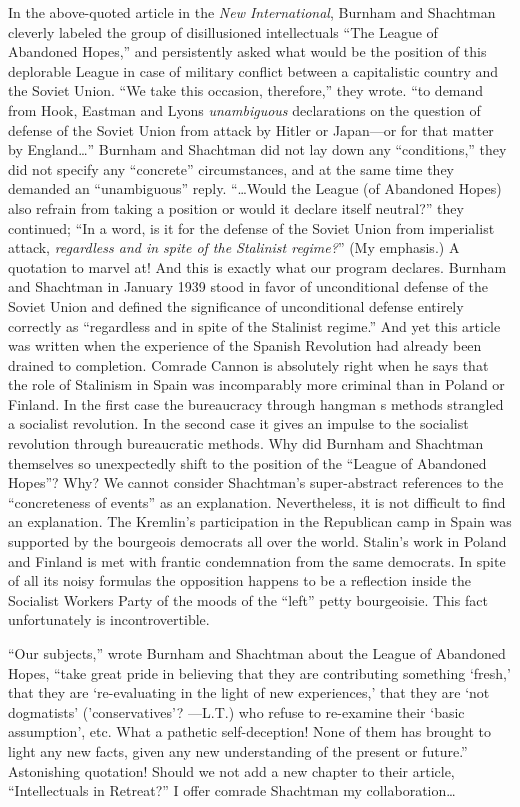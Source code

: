 In the above-quoted article in the \emph{New International}, Burnham and Shachtman cleverly labeled the group of disillusioned intellectuals “The League of Abandoned Hopes,” and persistently asked what would be the position of this deplorable League in case of military conflict between a capitalistic country and the Soviet Union. “We take this occasion, therefore,” they wrote. “to demand from Hook, Eastman and Lyons \emph{unambiguous} declarations on the question of defense of the Soviet Union from attack by Hitler or Japan---or for that matter by England\dots” Burnham and Shachtman did not lay down any “conditions,” they did not specify any “concrete” circumstances, and at the same time they demanded an “unambiguous” reply. “\dots Would the League (of Abandoned Hopes) also refrain from taking a position or would it declare itself neutral?” they continued; “In a word, is it for the defense of the Soviet Union from imperialist attack, \emph{regardless and in spite of the Stalinist regime?}” (My emphasis.) A quotation to marvel at! And this is exactly what our program declares. Burnham and Shachtman in January 1939 stood in favor of unconditional defense of the Soviet Union and defined the significance of unconditional defense entirely correctly as “regardless and in spite of the Stalinist regime.” And yet this article was written when the experience of the Spanish Revolution had already been drained to completion. Comrade Cannon is absolutely right when he says that the role of Stalinism in Spain was incomparably more criminal than in Poland or Finland. In the first case the bureaucracy through hangman s methods strangled a socialist revolution. In the second case it gives an impulse to the socialist revolution through bureaucratic methods. Why did Burnham and Shachtman themselves so unexpectedly shift to the position of the “League of Abandoned Hopes”? Why? We cannot consider Shachtman’s super-abstract references to the “concreteness of events” as an explanation. Nevertheless, it is not difficult to find an explanation. The Kremlin’s participation in the Republican camp in Spain was supported by the bourgeois democrats all over the world. Stalin’s work in Poland and Finland is met with frantic condemnation from the same democrats. In spite of all its noisy formulas the opposition happens to be a reflection inside the Socialist Workers Party of the moods of the “left” petty bourgeoisie. This fact unfortunately is incontrovertible.

“Our subjects,” wrote Burnham and Shachtman about the League of Abandoned Hopes, “take great pride in believing that they are contributing something ‘fresh,’ that they are ‘re-evaluating in the light of new experiences,’ that they are ‘not dogmatists’ (’conservatives’? ---L.T.) who refuse to re-examine their ‘basic assumption’, etc. What a pathetic self-deception! None of them has brought to light any new facts, given any new understanding of the present or future.” Astonishing quotation! Should we not add a new chapter to their article, ``Intellectuals in Retreat?'' I offer comrade Shachtman my collaboration\dots

